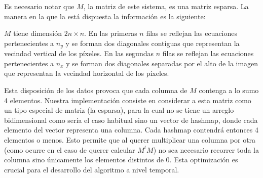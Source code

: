 Es necesario notar que $M$, la matriz de este sistema, es una matriz esparsa. La manera en la que la está dispuesta la información es la siguiente:

$M$ tiene dimensión $2n \times n$. En las primeras $n$ filas se reflejan las ecuaciones pertenecientes a $n_y$ y se forman dos diagonales contiguas que representan la vecindad vertical de los píxeles. En las segundas $n$ filas se reflejan las ecuaciones pertenecientes a $n_x$ y se forman dos diagonales separadas por el alto de la imagen que representan la vecindad horizontal de los píxeles.

Esta disposición de los datos provoca que cada columna de $M$ contenga a lo sumo 4 elementos. Nuestra implementación consiste en considerar a esta matriz como un tipo especial de matriz (la esparsa), para la cual no se tiene un arreglo bidimensional como sería el caso habitual sino un vector de hashmap, donde cada elemento del vector representa una columna. Cada hashmap contendrá entonces 4 elementos o menos. Esto permite que al querer multiplicar una columna por otra (como ocurre en el caso de querer calcular $M^tM$) no sea necesario recorrer toda la columna sino únicamente los elementos distintos de 0. Esta optimización es crucial para el desarrollo del algoritmo a nivel temporal.